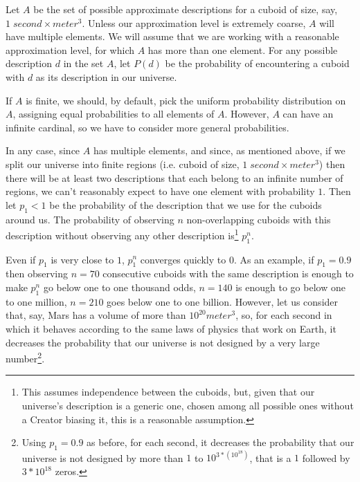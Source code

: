 \documentclass[a4paper
,draft
]{article}
\begin{document}
Let $A$ be the set of possible approximate descriptions for
a cuboid of size, say, $1\;second \times meter^3$.
Unless our approximation level is extremely coarse,
$A$ will have multiple elements.
We will assume that we are working with a reasonable approximation level,
for which $A$ has more than one element.
For any possible description $d$ in the set $A$,
let $P(d)$ be the probability of encountering
a cuboid with $d$ as its description in our universe.

If $A$ is finite, we should, by default, pick the uniform probability
distribution on $A$, assigning equal probabilities to all elements of $A$.
However, $A$ can have an infinite cardinal,
so we have to consider more general probabilities.

In any case, since $A$ has multiple elements, and since, as mentioned above,
if we split our universe into finite regions
(i.e. cuboid of size, $1\;second \times meter^3$) then there will be
at least two descriptions that each belong to an infinite number of regions,
we can't reasonably expect to have one element with probability $1$.
Then let $p_1<1$ be the probability of the description that we use for the
cuboids around us.
The probability of observing $n$
non-overlapping cuboids
with this description without observing any other description is\footnote{
  This assumes independence between the cuboids, but, given that our
  universe's description is a generic one, chosen among all possible
  ones without a Creator biasing it, this is a reasonable assumption.
}
$p_1^n$.

Even if $p_1$ is very close to $1$, $p_1^n$ converges quickly to $0$.
As an example, if $p_1=0.9$ then observing $n=70$ consecutive cuboids with
the same description is enough to make $p_1^n$ go below one to one thousand
odds, $n=140$ is enough to go below one to one million,
$n=210$ goes below one to one billion. However, let us consider that, say,
Mars has a volume of more than $10^{20} meter^3$, so, for each second
in which it behaves according to the same laws of physics that work on
Earth, it decreases the probability that our universe is not designed by a
very large number\footnote{Using $p_1=0.9$ as before, for each second,
it decreases the
probability that our universe is not designed by more than $1$ to
$10^{3*(10^{18})}$, that is a $1$ followed by $3*10^{18}$ zeros.}.
\end{document}
